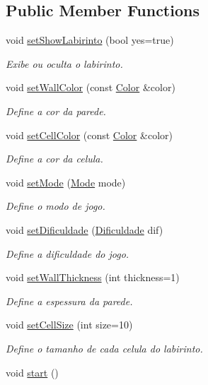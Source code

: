 \subsection*{Public Member Functions}
\begin{DoxyCompactItemize}
\item 
void \hyperlink{class_game_a290ed80541953c02d4012feae9cf84b4}{set\+Show\+Labirinto} (bool yes=true)
\begin{DoxyCompactList}\small\item\em Exibe ou oculta o labirinto. \end{DoxyCompactList}\item 
void \hyperlink{class_game_a74afd2e4820b0113a1276ba866e5e689}{set\+Wall\+Color} (const \hyperlink{class_color}{Color} \&color)
\begin{DoxyCompactList}\small\item\em Define a cor da parede. \end{DoxyCompactList}\item 
void \hyperlink{class_game_ae2c8fe91e4c6c7e7e49149bc70e7a5c8}{set\+Cell\+Color} (const \hyperlink{class_color}{Color} \&color)
\begin{DoxyCompactList}\small\item\em Define a cor da celula. \end{DoxyCompactList}\item 
void \hyperlink{class_game_a68e69f6f417f07c7f7bfc7e5660d23ab}{set\+Mode} (\hyperlink{class_game_a78224b33425ca8e37cc762f8a181663e}{Mode} mode)
\begin{DoxyCompactList}\small\item\em Define o modo de jogo. \end{DoxyCompactList}\item 
void \hyperlink{class_game_aaa49bf77525ace364d84eb5840fb7f16}{set\+Dificuldade} (\hyperlink{class_game_aa9e701b2208301d5a5a67816ea54fe19}{Dificuldade} dif)
\begin{DoxyCompactList}\small\item\em Define a dificuldade do jogo. \end{DoxyCompactList}\item 
void \hyperlink{class_game_a32ec249abb13c2d4f45f07003046536c}{set\+Wall\+Thickness} (int thickness=1)
\begin{DoxyCompactList}\small\item\em Define a espessura da parede. \end{DoxyCompactList}\item 
void \hyperlink{class_game_a2116158681dfa5fdb17e1ebbadd3348e}{set\+Cell\+Size} (int size=10)
\begin{DoxyCompactList}\small\item\em Define o tamanho de cada celula do labirinto. \end{DoxyCompactList}\item 
\hypertarget{class_game_a3d9b98f7c4a96ecf578f75b96c9f0e90}{}void \hyperlink{class_game_a3d9b98f7c4a96ecf578f75b96c9f0e90}{start} ()\label{class_game_a3d9b98f7c4a96ecf578f75b96c9f0e90}


\end{DoxyCompactItemize}
